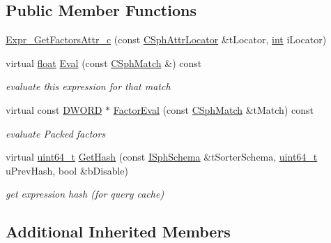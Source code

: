 \subsection*{Public Member Functions}
\begin{DoxyCompactItemize}
\item 
\hyperlink{structExpr__GetFactorsAttr__c_a4b0f45f0874d9e4dc6b25e1b4686c7a8}{Expr\-\_\-\-Get\-Factors\-Attr\-\_\-c} (const \hyperlink{structCSphAttrLocator}{C\-Sph\-Attr\-Locator} \&t\-Locator, \hyperlink{sphinxexpr_8cpp_a4a26e8f9cb8b736e0c4cbf4d16de985e}{int} i\-Locator)
\item 
virtual \hyperlink{sphinxexpr_8cpp_a0e0d0739f7035f18f949c2db2c6759ec}{float} \hyperlink{structExpr__GetFactorsAttr__c_a0fe5b0a1364659a0f943e4201a3aa70e}{Eval} (const \hyperlink{classCSphMatch}{C\-Sph\-Match} \&) const 
\begin{DoxyCompactList}\small\item\em evaluate this expression for that match \end{DoxyCompactList}\item 
virtual const \hyperlink{sphinxstd_8h_a798af1e30bc65f319c1a246cecf59e39}{D\-W\-O\-R\-D} $\ast$ \hyperlink{structExpr__GetFactorsAttr__c_adb6c663daa158ee0e4eb241e44dde073}{Factor\-Eval} (const \hyperlink{classCSphMatch}{C\-Sph\-Match} \&t\-Match) const 
\begin{DoxyCompactList}\small\item\em evaluate Packed factors \end{DoxyCompactList}\item 
virtual \hyperlink{sphinxstd_8h_aaa5d1cd013383c889537491c3cfd9aad}{uint64\-\_\-t} \hyperlink{structExpr__GetFactorsAttr__c_a8a1bdf34db86c76fbe990778795ce8d2}{Get\-Hash} (const \hyperlink{classISphSchema}{I\-Sph\-Schema} \&t\-Sorter\-Schema, \hyperlink{sphinxstd_8h_aaa5d1cd013383c889537491c3cfd9aad}{uint64\-\_\-t} u\-Prev\-Hash, bool \&b\-Disable)
\begin{DoxyCompactList}\small\item\em get expression hash (for query cache) \end{DoxyCompactList}\end{DoxyCompactItemize}
\subsection*{Additional Inherited Members}


